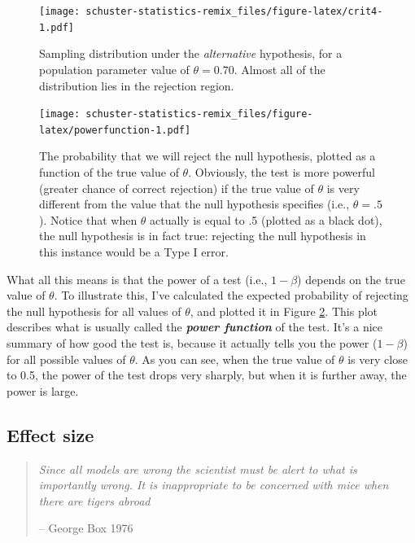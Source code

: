 \documentclass[
]{book}
\begin{document}
\begin{figure}
\centering
\texttt{[image: schuster-statistics-remix\_files/figure-latex/crit4-1.pdf]}
\caption{\label{fig:crit4}Sampling distribution under the \emph{alternative} hypothesis, for a population parameter value of \(\theta = 0.70\). Almost all of the distribution lies in the rejection region.}
\end{figure}

\begin{figure}
\centering
\texttt{[image: schuster-statistics-remix\_files/figure-latex/powerfunction-1.pdf]}
\caption{\label{fig:powerfunction}The probability that we will reject the null hypothesis, plotted as a function of the true value of \(\theta\). Obviously, the test is more powerful (greater chance of correct rejection) if the true value of \(\theta\) is very different from the value that the null hypothesis specifies (i.e., \(\theta=.5\)). Notice that when \(\theta\) actually is equal to .5 (plotted as a black dot), the null hypothesis is in fact true: rejecting the null hypothesis in this instance would be a Type I error.}
\end{figure}

What all this means is that the power of a test (i.e., \(1-\beta\)) depends on the true value of \(\theta\). To illustrate this, I've calculated the expected probability of rejecting the null hypothesis for all values of \(\theta\), and plotted it in Figure \ref{fig:powerfunction}. This plot describes what is usually called the \textbf{\emph{power function}} of the test. It's a nice summary of how good the test is, because it actually tells you the power (\(1-\beta\)) for all possible values of \(\theta\). As you can see, when the true value of \(\theta\) is very close to 0.5, the power of the test drops very sharply, but when it is further away, the power is large.

\hypertarget{effect-size}{%
\subsection{Effect size}\label{effect-size}}

\begin{quote}
\emph{Since all models are wrong the scientist must be alert to what is importantly wrong. It is inappropriate to be concerned with mice when there are tigers abroad}

-- George Box 1976
\end{quote}
\end{document}
